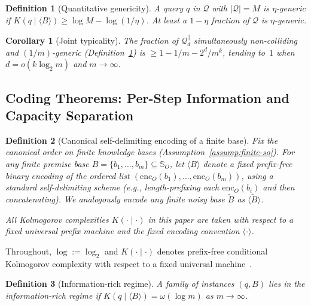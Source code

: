 \documentclass[journal]{IEEEtran}
\newcommand{\enc}{\text{enc}}
\newtheorem{corollary}{Corollary}[section]
\newtheorem{definition}{Definition}[section]
\numberwithin{equation}{section}
\begin{document}
\begin{definition}[Quantitative genericity]
\label{def:quantitative-generic}
A query $q$ in $\mathcal{Q}$ with $|\mathcal{Q}|=M$ is
\emph{$\eta$-generic} if
$K(q\mid\langle B\rangle)\ge\log M-\log(1/\eta)$.
At least a $1{-}\eta$ fraction of $\mathcal{Q}$ is
$\eta$-generic.
\end{definition}

\begin{corollary}[Joint typicality]
\label{cor:joint-typicality}
The fraction of $\mathcal{Q}_d^{\parallel}$ simultaneously
non-colliding and $(1/m)$-generic
\textup{(Definition~\ref{def:quantitative-generic})} is
$\ge 1-1/m-2^d/m^k$, tending to~$1$ when
$d=o(k\log_2 m)$ and $m\to\infty$.
\end{corollary}

\subsection{Coding Theorems: Per-Step Information and Capacity
  Separation}
\label{subsec:coding-theorems}

\begin{definition}[Canonical self-delimiting encoding of a finite base]
\label{def:canonical-encoding}
Fix the canonical order on finite knowledge bases
(Assumption~\ref{assump:finite-so}).
For any finite premise base \(B=\{b_1,\ldots,b_m\}\subseteq\mathbb S_O\),
let \(\langle B\rangle\) denote a fixed \emph{prefix-free} binary encoding of the
ordered list \((\enc_O(b_1),\ldots,\enc_O(b_m))\), using a standard self-delimiting
scheme (e.g., length-prefixing each \(\enc_O(b_i)\) and then concatenating).
We analogously encode any finite noisy base \(\tilde B\) as \(\langle \tilde B\rangle\).

All Kolmogorov complexities \(K(\cdot\mid\cdot)\) in this paper are taken with
respect to a fixed universal prefix machine and the fixed encoding convention
\(\langle\cdot\rangle\).
\end{definition}

Throughout, $\log:=\log_2$ and $K(\cdot\mid\cdot)$ denotes
prefix-free conditional Kolmogorov complexity with respect to a
fixed universal machine~\cite{li2008introduction}.

\begin{definition}[Information-rich regime]
\label{def:info-rich}
A family of instances $(q,B)$ lies in the
\emph{information-rich regime} if
$K(q\mid\langle B\rangle)=\omega(\log m)$ as $m\to\infty$.
\end{definition}
\end{document}
